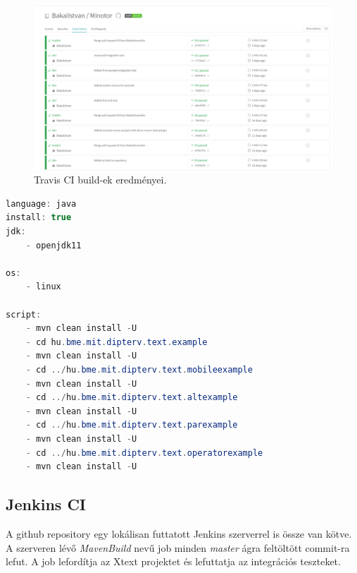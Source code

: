 \begin{figure}[!ht]
    \centering
    \includegraphics[width=150mm, keepaspectratio]{figures/travis_overview.png}
    \caption{Travis CI build-ek eredményei.}
\end{figure}

\begin{lstlisting}[language=java, frame=single, float=ht!, caption={Travis CI-hoz tartozó .travis.yml script.},captionpos=b]
language: java
install: true
jdk:
    - openjdk11

os:
    - linux

script:
    - mvn clean install -U
    - cd hu.bme.mit.dipterv.text.example
    - mvn clean install -U
    - cd ../hu.bme.mit.dipterv.text.mobileexample
    - mvn clean install -U
    - cd ../hu.bme.mit.dipterv.text.altexample
    - mvn clean install -U
    - cd ../hu.bme.mit.dipterv.text.parexample
    - mvn clean install -U
    - cd ../hu.bme.mit.dipterv.text.operatorexample
    - mvn clean install -U
\end{lstlisting}

\clearpage\subsection{Jenkins CI}

A github repository egy lokálisan futtatott Jenkins szerverrel is össze van kötve.
A szerveren lévő \textit{MavenBuild} nevű job minden \textit{master} ágra feltöltött commit-ra lefut.
A job lefordítja az Xtext projektet és lefuttatja az integrációs teszteket.


